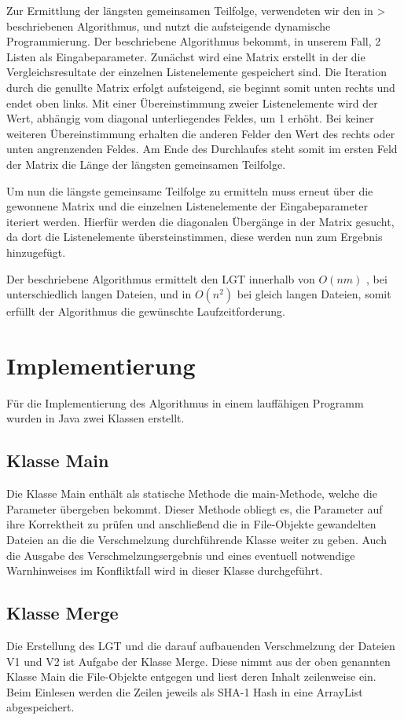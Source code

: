 \documentclass[a4paper,titlepage,12pt]{scrartcl}
\begin{document}
Zur Ermittlung der längsten gemeinsamen Teilfolge, verwendeten wir den in \citet{www:EP96}> beschriebenen Algorithmus, und nutzt die aufsteigende dynamische Programmierung.
Der beschriebene Algorithmus bekommt, in unserem Fall, 2 Listen als Eingabeparameter.
Zunächst wird eine Matrix erstellt in der die Vergleichsresultate der einzelnen Listenelemente gespeichert sind.
Die Iteration durch die genullte Matrix erfolgt aufsteigend, sie beginnt somit unten rechts und endet oben links.
Mit einer Übereinstimmung zweier Listenelemente wird der Wert, abhängig vom diagonal unterliegendes Feldes, um 1 erhöht.
Bei keiner weiteren Übereinstimmung erhalten die anderen Felder den Wert des rechts oder unten angrenzenden Feldes.
Am Ende des Durchlaufes steht somit im ersten Feld der Matrix die Länge der längsten gemeinsamen Teilfolge.

Um nun die längste gemeinsame Teilfolge zu ermitteln muss erneut über die gewonnene Matrix und die einzelnen Listenelemente der Eingabeparameter iteriert werden.
Hierfür werden die diagonalen Übergänge in der Matrix gesucht, da dort die Listenelemente übersteinstimmen, diese werden nun zum Ergebnis hinzugefügt.

Der beschriebene Algorithmus ermittelt den LGT innerhalb von $O(nm)$ , bei unterschiedlich langen Dateien, und in $O(n^2)$ bei gleich langen Dateien, somit erfüllt der Algorithmus die gewünschte
Laufzeitforderung.


\section{Implementierung}
\label{sec:implementation}
Für die Implementierung des Algorithmus in einem lauffähigen Programm wurden in Java zwei Klassen erstellt.

\subsection{Klasse Main}
\label{sec:classmain}
Die Klasse Main enthält als statische Methode die main-Methode, welche die Parameter übergeben bekommt. Dieser Methode obliegt es, die Parameter auf ihre Korrektheit zu prüfen und anschließend die in File-Objekte gewandelten Dateien an die die Verschmelzung durchführende Klasse weiter zu geben. Auch die Ausgabe des Verschmelzungsergebnis und eines eventuell notwendige Warnhinweises im Konfliktfall wird in dieser Klasse durchgeführt.

\subsection{Klasse Merge}
\label{sec:classmerge}
Die Erstellung des LGT und die darauf aufbauenden Verschmelzung der Dateien V1 und V2 ist Aufgabe der Klasse Merge. Diese nimmt aus der oben genannten Klasse Main die File-Objekte entgegen und liest deren Inhalt zeilenweise ein. Beim Einlesen werden die Zeilen jeweils als SHA-1 Hash in eine ArrayList abgespeichert.
\end{document}
